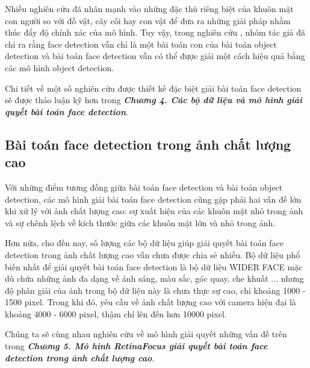 {    \noindent
    Nhiều nghiên cứu đã nhân mạnh vào những đặc thù riêng biệt của khuôn mặt con người so với đồ vật, cây cối hay con vật để đưa ra những giải pháp nhằm thúc đẩy độ chính xác của mô hình.
    Tuy vậy, trong nghiên cứu \cite{zhu2020tinaface}, nhóm tác giả đã chỉ ra rằng face detection vẫn chỉ là một bài toán con của bài toán object detection và bài toán face detection vẫn có thể được giải một cách hiệu quả bằng các mô hình object detection.

    \noindent
    Chi tiết về một số nghiên cứu được thiết kế đặc biệt giải bài toán face detection sẽ được thảo luận kỹ hơn trong \textbf{\textit{Chương 4. Các bộ dữ liệu và mô hình giải quyết bài toán face detection}}.
    
    \subsection{Bài toán face detection trong ảnh chất lượng cao}
    Với những điểm tương đồng giữa bài toán face detection và bài toán object detection, các mô hình giải bài toán face detection cũng gặp phải hai vấn đề lớn khi xử lý với ảnh chất lượng cao: sự xuất hiện của các khuôn mặt nhỏ trong ảnh và sự chênh lệch về kích thước giữa các khuôn mặt lớn và nhỏ trong ảnh.

    \noindent
    Hơn nữa, cho đến nay, số lượng các bộ dữ liệu giúp giải quyết bài toán face detection trong ảnh chất lượng cao vẫn chưa được chia sẻ nhiều.
    Bộ dữ liệu phổ biến nhất để giải quyết bài toán face detection là bộ dữ liệu WIDER FACE \cite{yang2016wider} mặc dù chứa những ảnh đa dạng về ánh sáng, màu sắc, góc quay, che khuất ... nhưng độ phân giải của ảnh trong bộ dữ liệu này là chưa thực sự cao, chỉ khoảng 1000 - 1500 pixel.
    Trong khi đó, yêu cầu về ảnh chất lượng cao với camera hiện đại là khoảng 4000 - 6000 pixel, thậm chí lên đến hơn 10000 pixel.

    \noindent
    Chúng ta sẽ cùng nhau nghiên cứu về mô hình giải quyết những vấn đề trên trong \textbf{\textit{Chương 5. Mô hình RetinaFocus giải quyết bài toán face detection trong ảnh chất lượng cao}}.
}